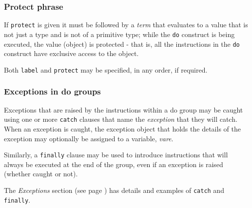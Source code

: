 \subsubsection{Protect phrase}
 
If \texttt{protect} is given it must be followed by a \emph{term}
that evaluates to a value that is not just a type and is not of a
primitive type; while the \texttt{do} construct is being executed, the
value (object) is protected - that is, all the instructions in the
\texttt{do} construct have exclusive access to the object.
 
Both \texttt{label} and \texttt{protect} may be specified, in any order,
if required.
\subsubsection{Exceptions in do groups}
 
Exceptions that are raised by the instructions within a do group may be
caught using one or more \texttt{catch} clauses that name the
\emph{exception} that they will catch.
When an exception is caught, the exception object that holds the details
of the exception may optionally be assigned to a variable,
\emph{vare}.
 
Similarly, a \texttt{finally} clause may be used to introduce
instructions that will always be executed at the end of the group, even
if an exception is raised (whether caught or not).
 
The  \emph{Exceptions} section (see page \pageref{refexcep})  has details and
examples of \texttt{catch} and \texttt{finally}.
\index{,}
